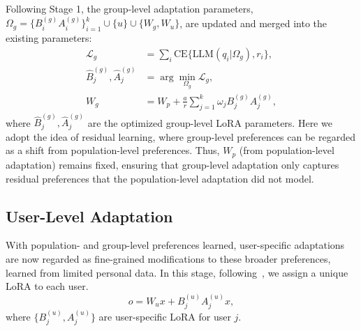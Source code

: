\documentclass[11pt]{article}
\begin{document}
Following Stage 1, the group-level adaptation parameters, $\Omega_g=\{B_i^{(g)} A_i^{(g)}\}_{i=1}^k \cup \{u\} \cup \{W_g,W_u\}$, are updated and merged into the existing parameters: 
\begin{equation}
\begin{split}
    \mathcal{L}_g &= \sum_i\text{CE}\{\text{LLM}(q_i|\Omega_g),r_i\}, \\
    \hat{B}_j^{(g)}, \hat{A}_j^{(g)} &= \arg\min_{\Omega_g} \mathcal{L}_g, \\
    W_g &= W_p + \frac{a}{r} \sum^k_{j=1} \omega_j B_j^{(g)} A_j^{(g)},
\end{split}
\end{equation}
where $\hat{B}_j^{(g)}, \hat{A}_j^{(g)}$ are the optimized group-level LoRA parameters. 
Here we adopt the idea of residual learning, where group-level preferences can be regarded as a shift from population-level preferences.
Thus, $W_p$ (from population-level adaptation) remains fixed, ensuring that group-level adaptation only captures residual preferences that the population-level adaptation did not model. 


\subsection{User-Level Adaptation}
With population- and group-level preferences learned, user-specific adaptations are now regarded as fine-grained modifications to these broader preferences, learned from limited personal data. 
In this stage, following~\cite{tan-etal-2024-democratizing}, we assign a unique LoRA to each user. 
\begin{equation}
    o = W_u x + B_j^{(u)} A_j^{(u)} x,
\end{equation}
where $\{B_j^{(u)}, A_j^{(u)}\}$ are user-specific LoRA for user $j$. 
\end{document}
